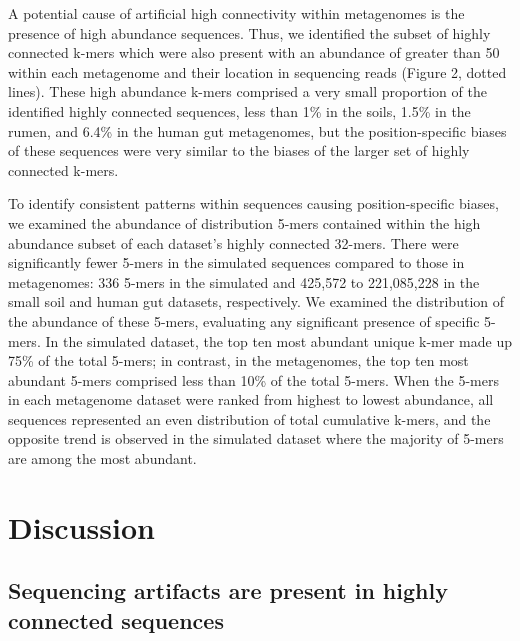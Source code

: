 \documentclass[10pt]{article}
\begin{document}
A potential cause of artificial high connectivity within metagenomes
is the presence of high abundance sequences.  Thus, we identified the
subset of highly connected k-mers which were also present with an
abundance of greater than 50 within each metagenome and their location
in sequencing reads (Figure 2, dotted lines).  These high abundance
k-mers comprised a very small proportion of the identified highly
connected sequences, less than 1\% in the soils, 1.5\% in the rumen,
and 6.4\% in the human gut metagenomes, but the position-specific
biases of these sequences were very similar to the biases of the
larger set of highly connected k-mers.

To identify consistent patterns within sequences causing
position-specific biases, we examined the abundance of distribution
5-mers contained within the high abundance subset of each dataset's
highly connected 32-mers.  There were significantly fewer 5-mers in
the simulated sequences compared to those in metagenomes: 336 5-mers
in the simulated and 425,572 to 221,085,228 in the small soil and
human gut datasets, respectively.  We examined the distribution of the
abundance of these 5-mers, evaluating any significant presence of
specific 5-mers.  In the simulated dataset, the top ten most abundant
unique k-mer made up 75\% of the total 5-mers; in contrast, in the
metagenomes, the top ten most abundant 5-mers comprised less than 10\%
of the total 5-mers.  When the 5-mers in each metagenome dataset were
ranked from highest to lowest abundance, all sequences represented an
even distribution of total cumulative k-mers, and the opposite trend
is observed in the simulated dataset where the majority of 5-mers are
among the most abundant.

\section*{Discussion}

\subsection*{Sequencing artifacts are present in highly connected sequences}
\end{document}
